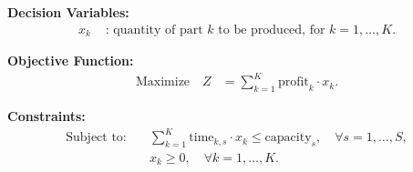 \documentclass{article}
\begin{document}
\textbf{Decision Variables:}
\begin{align*}
x_k & \text{ : quantity of part } k \text{ to be produced, for } k = 1, \ldots, K.
\end{align*}

\textbf{Objective Function:}
\begin{align*}
\text{Maximize} \quad Z & = \sum_{k=1}^{K} \text{profit}_{k} \cdot x_k.
\end{align*}

\textbf{Constraints:}
\begin{align*}
\text{Subject to:} \quad & \sum_{k=1}^{K} \text{time}_{k, s} \cdot x_k \leq \text{capacity}_{s}, \quad \forall s = 1, \ldots, S, \\
& x_k \geq 0, \quad \forall k = 1, \ldots, K.
\end{align*}
\end{document}
